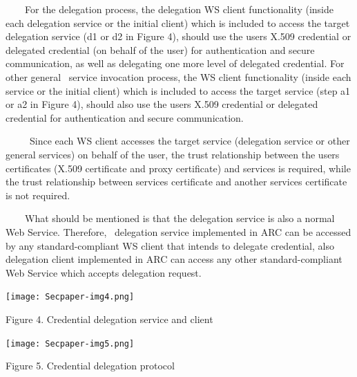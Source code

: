 \documentclass{article}
\begin{document}
\ \ \ \ For the delegation process, the delegation WS client
functionality (inside each delegation service or the initial client)
which is included to access the target delegation service (d1 or d2 in
Figure 4), should use the user{\textquotesingle}s X.509 credential or
delegated credential (on behalf of the user) for authentication and
secure communication, as well as delegating one more level of delegated
credential. For other general \ service invocation process, the WS
client functionality (inside each service or the initial client) which
is included to access the target service (step a1 or a2 in Figure 4),
should also use the user{\textquotesingle}s X.509 credential or
delegated credential for authentication and secure communication. 

\ \ \ \ \ Since each WS client accesses the target service (delegation
service or other general services) on behalf of the user, the trust
relationship between the user{\textquotesingle}s certificates (X.509
certificate and proxy certificate) and services is required, while the
trust relationship between service{\textquotesingle}s certificate and
another service{\textquotesingle}s certificate is not required.

\ \ \ \ What should be mentioned is that the delegation service is also
a normal Web Service. Therefore, \ delegation service implemented in
ARC can be accessed by any standard-compliant WS client that intends to
delegate credential, also delegation client implemented in ARC can
access any other standard-compliant Web Service which accepts
delegation request.

 

\begin{center}
\texttt{[image: Secpaper-img4.png]}
\end{center}

\bigskip


\bigskip

{\centering
Figure 4. Credential delegation service and client
\par}


\bigskip


\bigskip



\begin{center}
\texttt{[image: Secpaper-img5.png]}
\end{center}
{\centering
Figure 5. Credential delegation protocol
\par}


\bigskip
\end{document}
